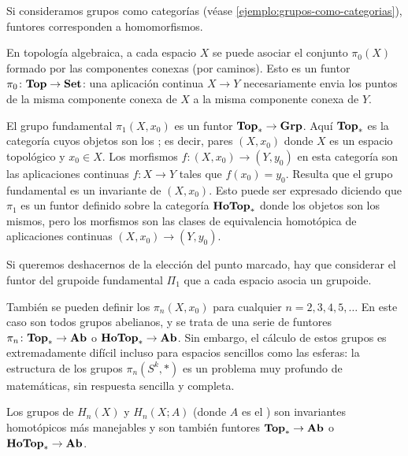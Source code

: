\documentclass{article}
\numberwithin{equation}{section}
\theoremstyle{definition}
\begin{document}
\begin{ejemplo}
  Si consideramos grupos como categorías (véase
  \ref{ejemplo:grupos-como-categorias}), funtores corresponden a homomorfismos.
\end{ejemplo}

\begin{ejemplo}
  En topología algebraica, a cada espacio $X$ se puede asociar el conjunto
  $\pi_0 (X)$ formado por las componentes conexas (por caminos). Esto es un
  funtor $\pi_0\colon \text{\bf Top} \to \text{\bf Set}$: una aplicación continua
  $X\to Y$ necesariamente envia los puntos de la misma componente conexa de $X$
  a la misma componente conexa de $Y$.

  El grupo fundamental $\pi_1 (X,x_0)$ es un funtor
  $\text{\bf Top}_\ast \to \text{\bf Grp}$. Aquí $\text{\bf Top}_\ast$ es la categoría
  cuyos objetos son los ; es
  decir, pares $(X,x_0)$ donde $X$ es un espacio topológico y $x_0\in X$. Los
  morfismos $f\colon (X,x_0) \to (Y,y_0)$ en esta categoría son las aplicaciones
  continuas $f\colon X\to Y$ tales que $f (x_0) = y_0$. Resulta que el grupo
  fundamental es un invariante  de $(X,x_0)$. Esto puede ser
  expresado diciendo que $\pi_1$ es un funtor definido sobre la categoría
  $\text{\bf HoTop}_\ast$ donde los objetos son los mismos, pero los morfismos son
  las clases de equivalencia homotópica de aplicaciones continuas
  $(X,x_0)\to (Y,y_0)$.

  Si queremos deshacernos de la elección del punto marcado, hay que considerar
  el funtor del grupoide fundamental $\Pi_1$ que a cada espacio asocia un
  grupoide.

  También se pueden definir los 
  $\pi_n (X,x_0)$ para cualquier $n = 2,3,4,5,\ldots$ En este caso son todos
  grupos abelianos, y se trata de una serie de funtores
  $\pi_n\colon \text{\bf Top}_\ast \to \text{\bf Ab}$ o
  ${\text{\bf HoTop}_* \to \text{\bf Ab}}$. Sin embargo, el cálculo de estos grupos es
  extremadamente difícil incluso para espacios sencillos como las esferas: la
  estructura de los grupos $\pi_n (S^k, \ast)$ es un problema muy profundo de
  matemáticas, sin respuesta sencilla y completa.

  Los grupos de  $H_n (X)$ y  $H_n (X;A)$
  (donde $A$ es el ) son invariantes homotópicos más
  manejables y son también funtores $\text{\bf Top}_\ast \to \text{\bf Ab}$ o
  $\text{\bf HoTop}_* \to \text{\bf Ab}$.
\end{ejemplo}
\end{document}
